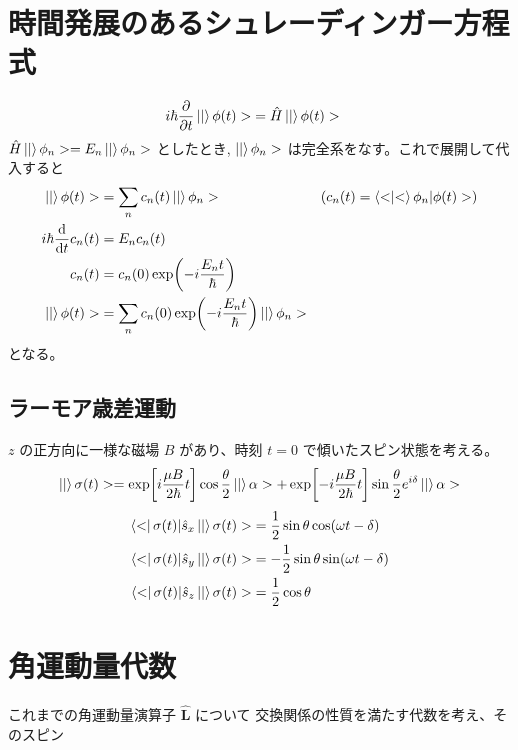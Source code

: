 \documentclass[uplatex,dvipdfmx,a4paper,11pt]{jlreq}
\numberwithin{equation}{section}
\theoremstyle{definition}
\begin{document}
\section{時間発展のあるシュレーディンガー方程式}
\begin{align}
  i\hbar\diffp{}{t}\ket|\phi(t)> & = \hat{H}\ket|\phi(t)>
\end{align}
$\hat{H}\ket|\phi_n> = E_n\ket|\phi_n>$ としたとき, $\ket|\phi_n>$ は完全系をなす。これで展開して代入すると
\begin{align}
  \ket|\phi(t)>      & = \sum_nc_n(t)\ket|\phi_n>                           & \qty(c_n(t) = \braket<\phi_n|\phi(t)>) \\
  i\hbar\dv{t}c_n(t) & = E_nc_n(t)                                                                                   \\
  c_n(t)             & = c_n(0)\exp(-i\frac{E_nt}{\hbar})                                                            \\
  \ket|\phi(t)>      & = \sum_nc_n(0)\exp(-i\frac{E_nt}{\hbar})\ket|\phi_n>
\end{align}
となる。


\subsection{ラーモア歳差運動}
$z$ の正方向に一様な磁場 $B$ があり、時刻 $t = 0$ で傾いたスピン状態を考える。
\begin{align}
  \ket|\sigma(t)> = \exp[i\frac{\mu B}{2\hbar}t]\cos\frac{\theta}{2}\ket|\alpha> + \exp[-i\frac{\mu B}{2\hbar}t]\sin\frac{\theta}{2}e^{i\delta}\ket|\alpha>
\end{align}
\begin{align}
  \bra<\sigma(t)|\hat{s}_x\ket|\sigma(t)> & = \frac{1}{2}\sin\theta\cos(\omega t - \delta)  \\
  \bra<\sigma(t)|\hat{s}_y\ket|\sigma(t)> & = -\frac{1}{2}\sin\theta\sin(\omega t - \delta) \\
  \bra<\sigma(t)|\hat{s}_z\ket|\sigma(t)> & = \frac{1}{2}\cos\theta
\end{align}



\section{角運動量代数}
これまでの角運動量演算子 $\hat{\bm{L}}$ について
交換関係の性質を満たす代数を考え、そのスピン
\end{document}
